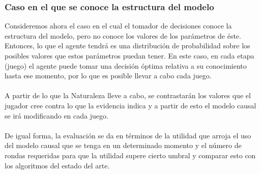 \documentclass[11pt]{article}
\theoremstyle{plain}
\begin{document}
\subsubsection{Caso en el que se conoce la estructura del modelo}
Consideremos ahora el caso en el cual el tomador de decisiones conoce la estructura del modelo, pero no conoce los valores de los parámetros de éste. Entonces, lo que el agente tendrá es una distribución de probabilidad sobre los posibles valores que estos parámetros puedan tener. En este caso, en cada etapa (juego) el agente puede tomar una decisión óptima relativa a su conocimiento hasta ese momento, por lo que es posible llevar a cabo cada juego.\\
\\
A partir de lo que la Naturaleza lleve a cabo, se contrastarán los valores que el jugador cree contra lo que la evidencia indica y a partir de esto el modelo causal se irá modificando en cada juego.\\
\\
De igual forma, la evaluación se da en términos de la utilidad que arroja el uso del modelo causal que se tenga en un determinado momento y el número de rondas requeridas para que la utilidad supere cierto umbral y comparar esto con los algoritmos del estado del arte.
\end{document}
